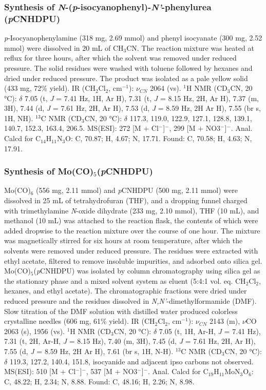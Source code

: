 \subsubsection{Synthesis of \textit{N}-(\textit{p}-isocyanophenyl)-\textit{N'}-phenylurea (\textit{p}CNHDPU)} \textit{p}-Isocyanophenylamine (318 mg, 2.69 mmol) and phenyl isocyanate (300 mg, 2.52 mmol) were dissolved in 20 mL of CH$_{3}$CN. The reaction mixture was heated at reflux for three hours, after which the solvent was removed under reduced pressure. The solid residues were washed with toluene followed by hexanes and dried under reduced pressure. The product was isolated as a pale yellow solid (433 mg, 72\% yield). IR (CH$_{2}$Cl$_{2}$, cm$^{-1}$): $\nu_{CN}$ 2064 (vs). $^{1}$H NMR (CD$_{3}$CN, 20 °C): $\delta$ 7.05 (t, \textit{J} = 7.41 Hz, 1H, Ar H), 7.31 (t, \textit{J} = 8.15 Hz, 2H, Ar H), 7.37 (m, 3H), 7.44 (d, \textit{J} = 7.61 Hz, 2H, Ar H), 7.53 (d, \textit{J} = 8.59 Hz, 2H Ar H), 7.55 (br s, 1H, NH). $^{13}$C NMR (CD$_{3}$CN, 20 °C): $\delta$ 117.3, 119.0, 122.9, 127.1, 128.8, 139.1, 140.7, 152.3, 163.4, 206.5. MS(ESI):  272 [M + Cl$^{-}$]$^{-}$, 299 [M + NO3$^{-}$]$^{-}$. Anal. Calcd for C$_{14}$H$_{11}$N$_{3}$O: C, 70.87; H, 4.67; N, 17.71. Found: C, 70.58; H, 4.63; N, 17.91. 

\subsubsection{Synthesis of Mo(CO)$_{5}$(\textit{p}CNHDPU)} Mo(CO)$_{6}$ (556 mg, 2.11 mmol) and \textit{p}CNHDPU (500 mg, 2.11 mmol) were dissolved in 25 mL of tetrahydrofuran (THF), and a dropping funnel charged with trimethylamine \textit{N}-oxide dihydrate (233 mg, 2.10 mmol), THF (10 mL), and methanol (10 mL) was attached to the reaction flask, the contents of which were added dropwise to the reaction mixture over the course of one hour. The mixture was magnetically stirred for six hours at room temperature, after which the solvents were removed under reduced pressure. The residues were extracted with ethyl acetate, filtered to remove insoluble impurities, and adsorbed onto silica gel. Mo(CO)$_{5}$(\textit{p}CNHDPU) was isolated by column chromatography using silica gel as the stationary phase and a mixed solvent system as eluent (5:4:1 vol. eq. CH$_{2}$Cl$_{2}$, hexanes, and ethyl acetate). The chromatographic fractions were dried under reduced pressure and the residues dissolved in \textit{N,N'}-dimethylformamide (DMF). Slow titration of the DMF solution with distilled water produced colorless crystalline needles (606 mg, 61\% yield). IR (CH$_{2}$Cl$_{2}$, cm$^{-1}$): $\nu_{CN}$ 2143 (m), $\nu$CO 2063 (s), 1956 (vs). $^{1}$H NMR (CD$_{3}$CN, 20 °C): $\delta$ 7.05 (t, 1H, Ar-H, \textit{J} = 7.41 Hz), 7.31 (t, 2H, Ar-H, \textit{J} = 8.15 Hz), 7.40 (m, 3H), 7.45 (d, \textit{J} = 7.61 Hz, 2H, Ar H), 7.55 (d, \textit{J} = 8.59 Hz, 2H Ar H), 7.61 (br s, 1H, N-H). $^{13}$C NMR (CD$_{3}$CN, 20 °C): $\delta$ 119.3, 127.2, 140.4, 151.8, isocyanide and adjacent ipso carbons not observed. MS(ESI):  510 [M + Cl$^{-}$]$^{-}$, 537 [M + NO3$^{-}$]$^{-}$. Anal. Calcd for C$_{19}$H$_{11}$MoN$_{3}$O$_{6}$: C, 48.22; H, 2.34; N, 8.88. Found: C, 48.16; H, 2.26; N, 8.98.

